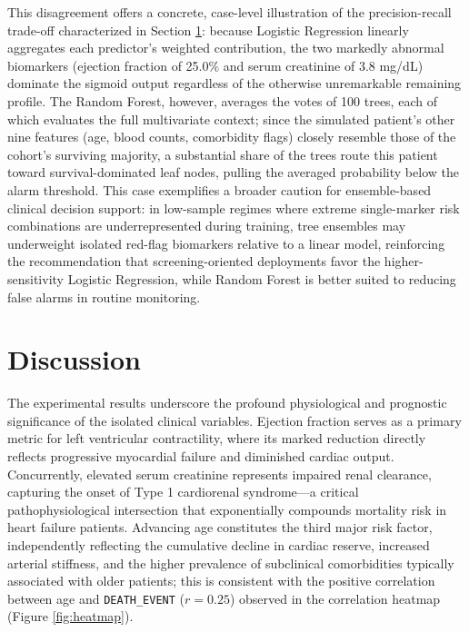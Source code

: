 \documentclass[11pt]{article} %
\begin{document}
This disagreement offers a concrete, case-level illustration of the precision-recall trade-off characterized in Section \ref{sec:discussion}: because Logistic Regression linearly aggregates each predictor's weighted contribution, the two markedly abnormal biomarkers (ejection fraction of 25.0\% and serum creatinine of 3.8 mg/dL) dominate the sigmoid output regardless of the otherwise unremarkable remaining profile. The Random Forest, however, averages the votes of 100 trees, each of which evaluates the full multivariate context; since the simulated patient's other nine features (age, blood counts, comorbidity flags) closely resemble those of the cohort's surviving majority, a substantial share of the trees route this patient toward survival-dominated leaf nodes, pulling the averaged probability below the alarm threshold. This case exemplifies a broader caution for ensemble-based clinical decision support: in low-sample regimes where extreme single-marker risk combinations are underrepresented during training, tree ensembles may underweight isolated red-flag biomarkers relative to a linear model, reinforcing the recommendation that screening-oriented deployments favor the higher-sensitivity Logistic Regression, while Random Forest is better suited to reducing false alarms in routine monitoring.



\section{Discussion}
\label{sec:discussion}

The experimental results underscore the profound physiological and prognostic significance of the isolated clinical variables. Ejection fraction serves as a primary metric for left ventricular contractility, where its marked reduction directly reflects progressive myocardial failure and diminished cardiac output. Concurrently, elevated serum creatinine represents impaired renal clearance, capturing the onset of Type 1 cardiorenal syndrome—a critical pathophysiological intersection that exponentially compounds mortality risk in heart failure patients. Advancing age constitutes the third major risk factor, independently reflecting the cumulative decline in cardiac reserve, increased arterial stiffness, and the higher prevalence of subclinical comorbidities typically associated with older patients; this is consistent with the positive correlation between age and \texttt{DEATH\_EVENT} ($r=0.25$) observed in the correlation heatmap (Figure \ref{fig:heatmap}).
\end{document}
